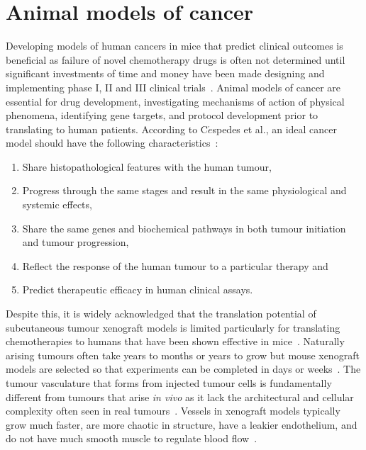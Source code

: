 \section{Animal models of cancer}

Developing models of human cancers in mice that predict clinical outcomes is beneficial as failure of novel chemotherapy drugs is often not determined until significant investments of time and money have been made designing and implementing phase I, II and III clinical trials~\cite{Rosenberg:1998ty}.
Animal models of cancer are essential for drug development, investigating mechanisms of action of physical phenomena, identifying gene targets, and protocol development prior to translating to human patients.
According to C$\acute{e}$spedes et al., an ideal cancer model should have the following characteristics~\cite{Cespedes:2006js}:
	
\begin{enumerate}
	\item Share histopathological features with the human tumour,
	\item Progress through the same stages and result in the same physiological and systemic effects,
	\item Share the same genes and biochemical pathways in both tumour initiation and tumour progression,
	\item Reflect the response of the human tumour to a particular therapy and
	\item Predict therapeutic efficacy in human clinical assays.
\end{enumerate}

Despite this, it is widely acknowledged that the translation potential of subcutaneous tumour xenograft models is limited particularly for translating chemotherapies to humans that have been shown effective in mice~\cite{Eklund:2013gm,deJong:2010cd}.
Naturally arising tumours often take years to months or years to grow but mouse xenograft models are selected so that experiments can be completed in days or weeks~\cite{Kamb:2005ix}.
The tumour vasculature that forms from injected tumour cells is fundamentally different from tumours that arise \emph{in vivo} as it lack the architectural and cellular complexity often seen in real tumours~\cite{Kamb:2005ix}.
Vessels in xenograft models typically grow much faster, are more chaotic in structure, have a leakier endothelium, and do not have much smooth muscle to regulate blood flow~\cite{Rosenberg:1998ty,Kamb:2005ix}. 

